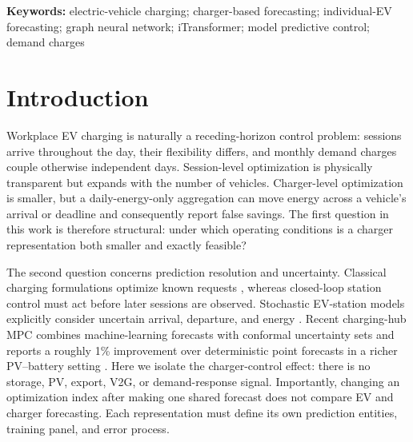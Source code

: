 \documentclass[11pt]{article}
\begin{document}
\noindent\textbf{Keywords:} electric-vehicle charging; charger-based
forecasting; individual-EV forecasting; graph neural network; iTransformer;
model predictive control; demand charges

\section{Introduction}

Workplace EV charging is naturally a receding-horizon control problem: sessions
arrive throughout the day, their flexibility differs, and monthly demand
charges couple otherwise independent days.  Session-level optimization is
physically transparent but expands with the number of vehicles.  Charger-level
optimization is smaller, but a daily-energy-only aggregation can move energy
across a vehicle's arrival or deadline and consequently report false savings.
The first question in this work is therefore structural: under which operating
conditions is a charger representation both smaller and exactly feasible?

The second question concerns prediction resolution and uncertainty.  Classical
charging formulations
optimize known requests \citep{sortomme2011optimal,gan2013optimal}, whereas
closed-loop station control must act before later sessions are observed.
Stochastic EV-station models explicitly consider uncertain arrival, departure,
and energy \citep{puech2024controlling}.  Recent charging-hub MPC combines
machine-learning forecasts with conformal uncertainty sets and reports a
roughly 1\% improvement over deterministic point forecasts in a richer
PV--battery setting \citep{fernandez2025conformal}.  Here we isolate the
charger-control effect: there is no storage, PV, export, V2G, or demand-response
signal.  Importantly, changing an optimization index after making one shared
forecast does not compare EV and charger forecasting.  Each representation
must define its own prediction entities, training panel, and error process.
\end{document}

